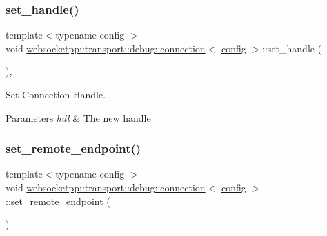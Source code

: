 \subsubsection{\texorpdfstring{set\+\_\+handle()}{set\_handle()}}
{\footnotesize\ttfamily template$<$typename config $>$ \\
void \mbox{\hyperlink{classwebsocketpp_1_1transport_1_1debug_1_1connection}{websocketpp\+::transport\+::debug\+::connection}}$<$ \mbox{\hyperlink{classconfig}{config}} $>$\+::set\+\_\+handle (\begin{DoxyParamCaption}\item[{\mbox{\hyperlink{namespacewebsocketpp_a6b3d26a10ee7229b84b776786332631d}{connection\+\_\+hdl}}}]{ }\end{DoxyParamCaption})\hspace{0.3cm}{\ttfamily [inline]}, {\ttfamily [protected]}}



Set Connection Handle. 


\begin{DoxyParams}{Parameters}
{\em hdl} & The new handle \\
\hline
\end{DoxyParams}
\mbox{\label{classwebsocketpp_1_1transport_1_1debug_1_1connection_a3c0a3a5bc888a570c287190d299cf276}} 
\subsubsection{\texorpdfstring{set\+\_\+remote\+\_\+endpoint()}{set\_remote\_endpoint()}}
{\footnotesize\ttfamily template$<$typename config $>$ \\
void \mbox{\hyperlink{classwebsocketpp_1_1transport_1_1debug_1_1connection}{websocketpp\+::transport\+::debug\+::connection}}$<$ \mbox{\hyperlink{classconfig}{config}} $>$\+::set\+\_\+remote\+\_\+endpoint (\begin{DoxyParamCaption}\item[{std\+::string}]{ }\end{DoxyParamCaption})\hspace{0.3cm}{\ttfamily [inline]}}



